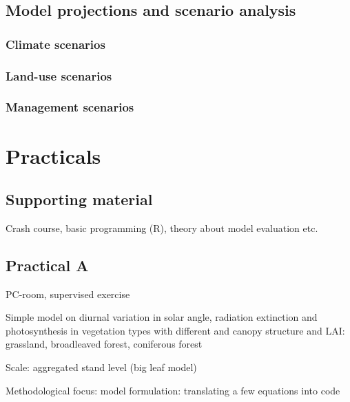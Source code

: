 \documentclass[oneside]{book}
\begin{document}
\chapter{Model projections and scenario
analysis}\label{model-projections-and-scenario-analysis}


\section{Climate scenarios}\label{climate-scenarios}

\section{Land-use scenarios}\label{land-use-scenarios}

\section{Management scenarios}\label{management-scenarios}

\part{Practicals}\label{part-practicals}

\chapter*{Supporting material}\label{supporting-material}

Crash course, basic programming (R), theory about model evaluation etc.

\chapter*{Practical A}\label{practical-a}

PC-room, supervised exercise

Simple model on diurnal variation in solar angle, radiation extinction
and photosynthesis in vegetation types with different and canopy
structure and LAI: grassland, broadleaved forest, coniferous forest

Scale: aggregated stand level (big leaf model)

Methodological focus: model formulation: translating a few equations
into code
\end{document}
